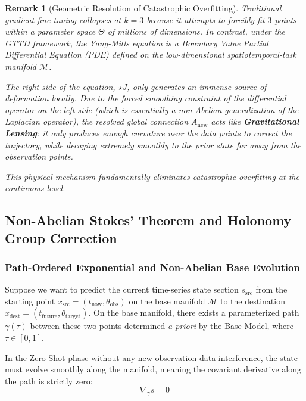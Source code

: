 \documentclass{article}
\newtheorem{remark}{Remark}[section]
\begin{document}
\begin{remark}[Geometric Resolution of Catastrophic Overfitting]
Traditional gradient fine-tuning collapses at $k=3$ because it attempts to forcibly fit $3$ points within a parameter space $\Theta$ of millions of dimensions. In contrast, under the GTTD framework, the Yang-Mills equation is a Boundary Value Partial Differential Equation (PDE) defined on the low-dimensional spatiotemporal-task manifold $\mathcal{M}$.

The right side of the equation, $\star J$, only generates an immense source of deformation locally. Due to the forced smoothing constraint of the differential operator on the left side (which is essentially a non-Abelian generalization of the Laplacian operator), the resolved global connection $A_{\text{new}}$ acts like \textbf{Gravitational Lensing}: it only produces enough curvature near the data points to correct the trajectory, while decaying extremely smoothly to the prior state far away from the observation points.

This physical mechanism fundamentally eliminates catastrophic overfitting at the continuous level.
\end{remark}

\subsection{Non-Abelian Stokes' Theorem and Holonomy Group Correction}

\subsubsection{Path-Ordered Exponential and Non-Abelian Base Evolution}

Suppose we want to predict the current time-series state section $s_{\text{src}}$ from the starting point $x_{\text{src}} = (t_{\text{now}}, \theta_{\text{obs}})$ on the base manifold $\mathcal{M}$ to the destination $x_{\text{dest}} = (t_{\text{future}}, \theta_{\text{target}})$. On the base manifold, there exists a parameterized path $\gamma(\tau)$ between these two points determined \textit{a priori} by the Base Model, where $\tau \in [0, 1]$.

In the Zero-Shot phase without any new observation data interference, the state must evolve smoothly along the manifold, meaning the covariant derivative along the path is strictly zero:
\begin{equation}
\nabla_{\dot{\gamma}} s = 0
\end{equation}
\end{document}
